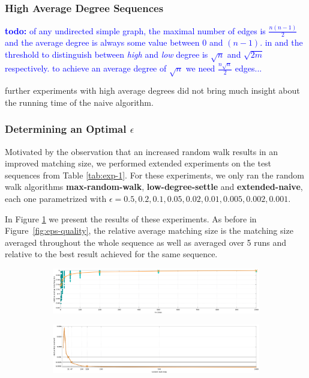 \documentclass{article}      %
\newcommand\todo[1]{\textcolor{blue}{\textbf{todo: }#1}}
\begin{document}
\subsubsection{High Average Degree Sequences}
\label{sec:high-avg-deg}

\todo{of any undirected simple graph, the maximal number of edges is $\frac{n(n-1)}{2}$ and the average degree is always some value between $0$ and $(n-1)$. in \cite{bgs} and \cite{ns} the threshold to distinguish between \emph{high} and \emph{low} degree is $\sqrt{n}$ and $\sqrt{2m}$ respectively. to achieve an average degree of $\sqrt{n}$ we need $\frac{n\sqrt{n}}{2}$ edges... }

further experiments with high average degrees did not bring much insight about the running time of the naive algorithm.

\subsubsection{Determining an Optimal $\epsilon$}
\label{sec:opt-eps}

Motivated by the observation that an increased random walk results in an improved matching size, we performed extended experiments on the test sequences from Table \ref{tab:exp-1}. For these experiments, we only ran the random walk algorithms \textbf{max-random-walk}, \textbf{low-degree-settle} and \textbf{extended-naive}, each one parametrized with $\epsilon=0.5, 0.2, 0.1, 0.05, 0.02, 0.01, 0.005, 0.002, 0.001$. 

In Figure \ref{fig:inc-eps-a} we present the results of these experiments. As before in Figure~\ref{fig:eps-quality}, the relative average matching size is the matching size averaged throughout the whole sequence as well as averaged over 5 runs and relative to the best result achieved for the same sequence.

\begin{figure}
	\centering
	\begin{subfigure}[b]{\textwidth}
		\includegraphics[width=\textwidth]{img/diff-eps-1.png}
		\caption{}
		\label{fig:inc-eps-a}
	\end{subfigure}
	\qquad
	\begin{subfigure}[b]{\textwidth}
		\includegraphics[width=\textwidth]{img/diff-eps-2.png}
		\caption{}
		\label{fig:inc-eps-b}
	\end{subfigure}
	\caption{}
	\label{fig:inc-eps}
\end{figure}
\end{document}
